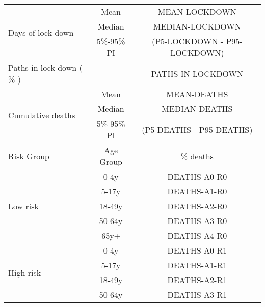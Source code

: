 \documentclass{article}
\begin{document}
\begin{table}[th]
\centering
\begin{tabular}{p{4cm}cc}
\toprule
\multirow{3}{*}{Days   of lock-down} & Mean      & MEAN-LOCKDOWN                        \\ \cmidrule(l){2-3} 
                                     & Median    & MEDIAN-LOCKDOWN                      \\ \cmidrule(l){2-3} 
                                     & 5\%-95\% PI & (P5-LOCKDOWN - P95-LOCKDOWN)       \\ \midrule 
\multirow{1}{*}{Paths in lock-down ( \% )} &      &         PATHS-IN-LOCKDOWN              \\   \midrule                     
\multirow{3}{\hsize}{Cumulative deaths}       & Mean      & MEAN-DEATHS \\ \cmidrule(l){2-3} 
                                     & Median    & MEDIAN-DEATHS                        \\ \cmidrule(l){2-3} 
                                     & 5\%-95\% PI & (P5-DEATHS - P95-DEATHS)           \\  \midrule
Risk Group                           & Age Group & \multicolumn{1}{c}{\% deaths}        \\  \midrule
\multirow{5}{*}{Low   risk}          & 0-4y      & DEATHS-A0-R0                         \\ \cmidrule(l){2-3} 
                                     & 5-17y     & DEATHS-A1-R0                         \\ \cmidrule(l){2-3} 
                                     & 18-49y    & DEATHS-A2-R0                         \\ \cmidrule(l){2-3} 
                                     & 50-64y    & DEATHS-A3-R0                         \\ \cmidrule(l){2-3} 
                                     & 65y+      & DEATHS-A4-R0                         \\ \midrule
\multirow{5}{*}{High   risk}         & 0-4y      & DEATHS-A0-R1                         \\ \cmidrule(l){2-3} 
                                     & 5-17y     & DEATHS-A1-R1                         \\ \cmidrule(l){2-3} 
                                     & 18-49y    & DEATHS-A2-R1                         \\ \cmidrule(l){2-3} 
                                     & 50-64y    & DEATHS-A3-R1                         \\ \cmidrule(l){2-3} 

\end{tabular}
\end{table}
\end{document}
